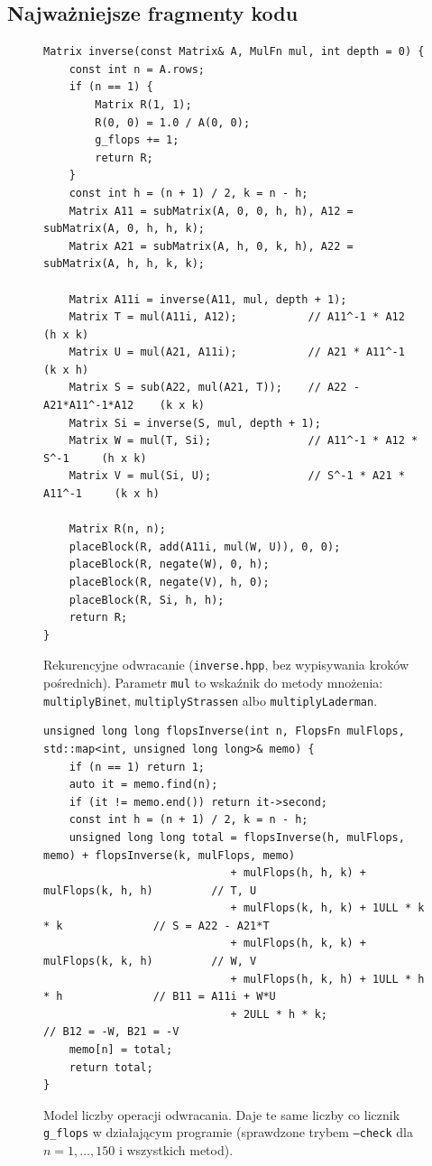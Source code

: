 \subsection{Najważniejsze fragmenty kodu}
\begin{figure}[H]
\centering
\begin{lstlisting}
Matrix inverse(const Matrix& A, MulFn mul, int depth = 0) {
    const int n = A.rows;
    if (n == 1) {
        Matrix R(1, 1);
        R(0, 0) = 1.0 / A(0, 0);
        g_flops += 1;
        return R;
    }
    const int h = (n + 1) / 2, k = n - h;
    Matrix A11 = subMatrix(A, 0, 0, h, h), A12 = subMatrix(A, 0, h, h, k);
    Matrix A21 = subMatrix(A, h, 0, k, h), A22 = subMatrix(A, h, h, k, k);

    Matrix A11i = inverse(A11, mul, depth + 1);
    Matrix T = mul(A11i, A12);           // A11^-1 * A12            (h x k)
    Matrix U = mul(A21, A11i);           // A21 * A11^-1            (k x h)
    Matrix S = sub(A22, mul(A21, T));    // A22 - A21*A11^-1*A12    (k x k)
    Matrix Si = inverse(S, mul, depth + 1);
    Matrix W = mul(T, Si);               // A11^-1 * A12 * S^-1     (h x k)
    Matrix V = mul(Si, U);               // S^-1 * A21 * A11^-1     (k x h)

    Matrix R(n, n);
    placeBlock(R, add(A11i, mul(W, U)), 0, 0);
    placeBlock(R, negate(W), 0, h);
    placeBlock(R, negate(V), h, 0);
    placeBlock(R, Si, h, h);
    return R;
}
\end{lstlisting}
\caption{Rekurencyjne odwracanie (\texttt{inverse.hpp}, bez wypisywania kroków pośrednich). Parametr \texttt{mul}
to wskaźnik do metody mnożenia: \texttt{multiplyBinet}, \texttt{multiplyStrassen} albo \texttt{multiplyLaderman}.}
\end{figure}

\begin{figure}[H]
\centering
\begin{lstlisting}
unsigned long long flopsInverse(int n, FlopsFn mulFlops, std::map<int, unsigned long long>& memo) {
    if (n == 1) return 1;
    auto it = memo.find(n);
    if (it != memo.end()) return it->second;
    const int h = (n + 1) / 2, k = n - h;
    unsigned long long total = flopsInverse(h, mulFlops, memo) + flopsInverse(k, mulFlops, memo)
                             + mulFlops(h, h, k) + mulFlops(k, h, h)         // T, U
                             + mulFlops(k, h, k) + 1ULL * k * k              // S = A22 - A21*T
                             + mulFlops(h, k, k) + mulFlops(k, k, h)         // W, V
                             + mulFlops(h, k, h) + 1ULL * h * h              // B11 = A11i + W*U
                             + 2ULL * h * k;                                 // B12 = -W, B21 = -V
    memo[n] = total;
    return total;
}
\end{lstlisting}
\caption{Model liczby operacji odwracania. Daje te same liczby co licznik \texttt{g\_flops} w działającym programie
(sprawdzone trybem \texttt{--check} dla $n=1,\dots,150$ i wszystkich metod).}
\end{figure}

